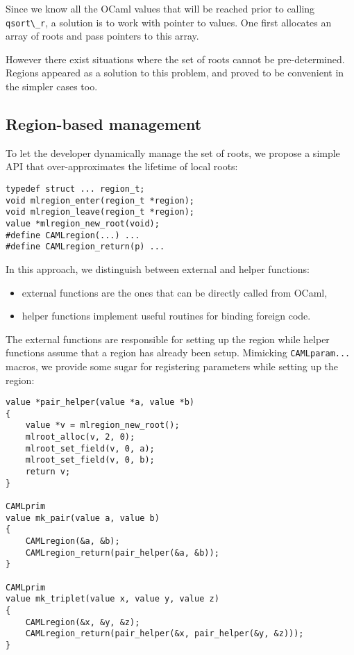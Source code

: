 \documentclass[a4paper]{easychair}
\newcommand{\cpp}[1]{\lstinline[style=C++]{#1}}
\begin{document}
Since we know all the OCaml values that will be reached prior to calling
\cpp{qsort\_r}, a solution is to work with pointer to values. One
first allocates an array of roots and pass pointers to this array.

However there exist situations where the set of roots cannot be pre-determined.
Regions appeared as a solution to this problem, and proved to be convenient in the simpler cases too.

\subsection{Region-based management}

To let the developer dynamically manage the set of roots, we propose a
simple API that over-approximates the lifetime of local roots:
%
\begin{lstlisting}[style=C++]
typedef struct ... region_t;
void mlregion_enter(region_t *region);
void mlregion_leave(region_t *region);
value *mlregion_new_root(void);
#define CAMLregion(...) ...
#define CAMLregion_return(p) ...
\end{lstlisting}

In this approach, we distinguish between external and helper functions:
%
\begin{itemize}
\item external functions are the ones that can be directly called from OCaml,
\item helper functions implement useful routines for binding foreign code.
\end{itemize}

The external functions are responsible for setting up the region while
helper functions assume that a region has already been setup. Mimicking
\cpp{CAMLparam...} macros, we provide some sugar for registering
parameters while setting up the region:
%
\begin{lstlisting}[style=C++]
value *pair_helper(value *a, value *b)
{
    value *v = mlregion_new_root();
    mlroot_alloc(v, 2, 0);
    mlroot_set_field(v, 0, a);
    mlroot_set_field(v, 0, b);
    return v;
}

CAMLprim
value mk_pair(value a, value b)
{
    CAMLregion(&a, &b);
    CAMLregion_return(pair_helper(&a, &b));
}

CAMLprim
value mk_triplet(value x, value y, value z)
{
    CAMLregion(&x, &y, &z);
    CAMLregion_return(pair_helper(&x, pair_helper(&y, &z)));
}
\end{lstlisting}
\end{document}
